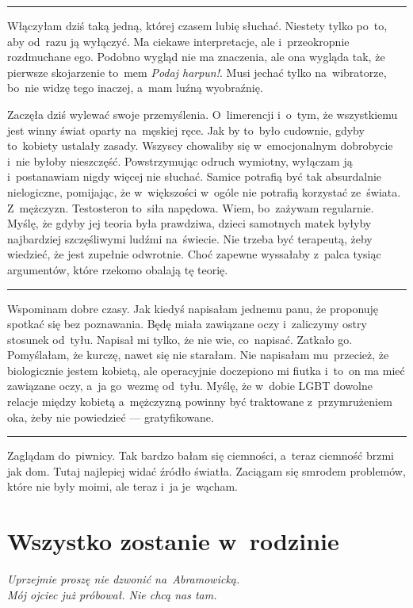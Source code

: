\documentclass[9pt, a5paper]{memoir}
\begin{document}
\fancybreak{* \quad * \quad *}

Włączyłam dziś taką jedną, której czasem lubię słuchać. Niestety tylko po~to, aby od~razu ją wyłączyć. Ma ciekawe interpretacje, ale i~przeokropnie rozdmuchane ego. Podobno wygląd nie ma znaczenia, ale ona wygląda tak, że pierwsze skojarzenie to~mem \textit{Podaj harpun!}. Musi jechać tylko na~wibratorze, bo~nie widzę tego inaczej, a~mam luźną wyobraźnię.

Zaczęła dziś wylewać swoje przemyślenia. O~limerencji i~o~tym, że wszystkiemu jest winny świat oparty na~męskiej ręce. Jak by to~było cudownie, gdyby to~kobiety ustalały zasady. Wszyscy chowaliby się w~emocjonalnym dobrobycie i~nie byłoby nieszczęść. Powstrzymując odruch wymiotny, wyłączam ją i~postanawiam nigdy więcej nie słuchać. Samice potrafią być tak absurdalnie nielogiczne, pomijając, że w~większości w~ogóle nie potrafią korzystać ze~świata. Z~mężczyzn. Testosteron to~siła napędowa. Wiem, bo~zażywam regularnie. Myślę, że gdyby jej teoria była prawdziwa, dzieci samotnych matek byłyby najbardziej szczęśliwymi ludźmi na~świecie. Nie trzeba być terapeutą, żeby wiedzieć, że jest zupełnie odwrotnie. Choć zapewne wyssałaby z~palca tysiąc argumentów, które rzekomo obalają tę teorię.

\fancybreak{* \quad * \quad *}

Wspominam dobre czasy. Jak kiedyś napisałam jednemu panu, że proponuję spotkać się bez poznawania. Będę miała zawiązane oczy i~zaliczymy ostry stosunek od~tyłu. Napisał mi tylko, że nie wie, co~napisać. Zatkało go. Pomyślałam, że kurczę, nawet się nie starałam. Nie napisałam mu~przecież, że biologicznie jestem kobietą, ale operacyjnie doczepiono mi fiutka i~to~on ma mieć zawiązane oczy, a~ja go~wezmę od~tyłu. Myślę, że w~dobie LGBT dowolne relacje między kobietą a~mężczyzną powinny być traktowane z~przymrużeniem oka, żeby nie powiedzieć --- gratyfikowane.

\fancybreak{* \quad * \quad *}

Zaglądam do~piwnicy. Tak bardzo bałam się ciemności, a~teraz ciemność brzmi jak dom. Tutaj najlepiej widać źródło światła. Zaciągam się smrodem problemów, które nie były moimi, ale teraz i~ja je~wącham.

\newpage
\section{Wszystko zostanie w~rodzinie}
{
\itshape
Uprzejmie proszę nie dzwonić na~Abramowicką.\\
Mój ojciec już próbował. Nie chcą nas tam.
}
\end{document}

